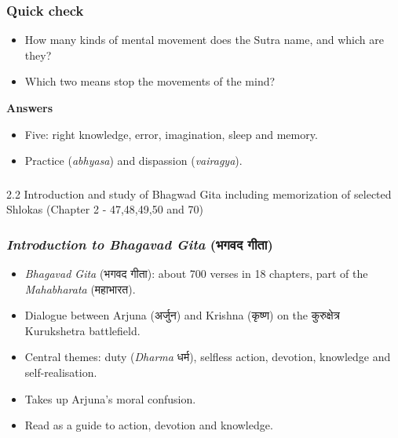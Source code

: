 \begin{frame}[fragile]\frametitle{Quick check}

    \begin{itemize}
        \item How many kinds of mental movement does the Sutra name, and which are they?
        \item Which two means stop the movements of the mind?
    \end{itemize}
    \vspace{0.5em}
    \textbf{Answers}
    \begin{itemize}
        \item Five: right knowledge, error, imagination, sleep and memory.
        \item Practice (\textit{abhyasa}) and dispassion (\textit{vairagya}).
    \end{itemize}

\end{frame}


\begin{frame}[fragile]\frametitle{}
\begin{center}
{\Large 2.2 Introduction and study of Bhagwad Gita including memorization of selected Shlokas (Chapter 2 - 47,48,49,50 and 70)}
\end{center}
\end{frame}

\begin{frame}[fragile]\frametitle{\textit{Introduction to Bhagavad Gita} (भगवद गीता)} 
	\begin{itemize} 
		\item \textit{Bhagavad Gita} (भगवद गीता): about 700 verses in 18 chapters, part of the \textit{Mahabharata} (महाभारत).
		\item Dialogue between Arjuna (अर्जुन) and Krishna (कृष्ण) on the कुरुक्षेत्र  Kurukshetra battlefield.
		\item Central themes: duty (\textit{Dharma} धर्म), selfless action, devotion, knowledge and self-realisation.
		\item Takes up Arjuna's moral confusion.
		\item Read as a guide to action, devotion and knowledge.
	\end{itemize} 
\end{frame}

